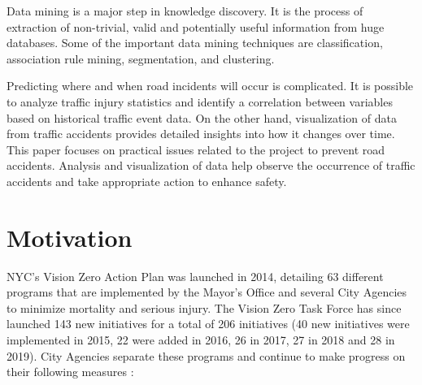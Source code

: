 \documentclass[conference]{IEEEtran}
\begin{document}
Data mining is a major step in knowledge discovery.  It is the process of extraction of non-trivial, valid and potentially useful information from huge databases. Some of the important data mining techniques are classification, association rule mining, segmentation, and clustering. 

Predicting where and when road incidents will occur is complicated. It is possible to analyze traffic injury statistics and identify a correlation between variables based on historical traffic event data. On the other hand, visualization of data from traffic accidents provides detailed insights into how it changes over time. This paper focuses on practical issues related to the project to prevent road accidents. Analysis and visualization of data help observe the occurrence of traffic accidents and take appropriate action to enhance  safety.    

\section{Motivation}
NYC’s Vision Zero Action Plan was launched in 2014, detailing 63 different programs that are implemented by the Mayor's Office and several City Agencies to minimize mortality and serious injury. The Vision Zero Task Force has since launched 143 new initiatives for a total of 206 initiatives (40 new initiatives were implemented in 2015, 22 were added in 2016, 26 in 2017, 27 in 2018 and 28 in 2019).  City Agencies separate these programs and continue to make progress on their following measures \cite{VisionZeroInitiative}:     
\end{document}
